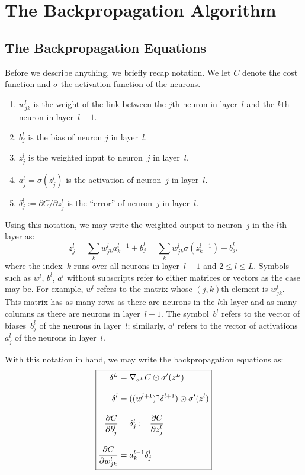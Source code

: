\chapter{The Backpropagation Algorithm}

\section{The Backpropagation Equations}

Before we describe anything, we briefly recap notation. We let 
$C$ denote the cost function and $\sigma$ the activation function 
of the neurons. 
\begin{enumerate}
    \item $w_{j k}^{l}$ is the weight of the link between the $j$th
        neuron in layer~$l$ and the $k$th neuron in layer~$l - 1$.
    \item $b_j^l$ is the bias of neuron $j$ in layer~$l$.
    \item $z_{j}^l$ is the weighted input to neuron~$j$ in layer~$l$.
    \item $a_j^{l} = \sigma(z_{j}^l)$ is the activation of neuron~$j$ in 
        layer~$l$.
    \item $\delta_{j}^{l} := \partial C / \partial z_{j}^{l}$ is 
        the ``error'' of neuron~$j$ in layer~$l$.
\end{enumerate}

Using this notation, we may write the weighted output to neuron~$j$
in the $l$th layer as:
\[
    z_{j}^{l} = \sum_{k} w_{j k}^l a_{k}^{l - 1} + b_{j}^l = 
                \sum_{k} w_{j k}^l \sigma (z_{k}^{l - 1}) + b_{j}^l, 
\]
where the index~$k$ runs over all neurons in layer~$l - 1$ and 
$2 \leq l \leq L$. Symbols such as $w^{l}$, $b^{l}$, $a^{l}$ without 
subscripts refer to either matrices or vectors as the case may be. 
For example, $w^{l}$ refers to the matrix whose $(j, k)$th element 
is $w_{j k}^{l}$. This matrix has as many rows as there are neurons
in the $l$th layer and as many columns as there are neurons in 
layer~$l - 1$. The symbol~$b^{l}$ refers to the vector of 
biases~$b_{j}^l$ of the neurons in layer~$l$; similarly, $a^{l}$ 
refers to the vector of activations~$a_{j}^l$ of the neurons in 
layer~$l$.

With this notation in hand, we may write the backpropagation equations
as:
\begin{equation}
\boxed{
\setlength{\jot}{12pt}
\begin{aligned}
    \delta^{L} & = \nabla_{a^L} C \odot \sigma'(z^L) \\
    \delta^{l} & = ( \trans{(w^{l + 1})} \delta^{l + 1} ) \odot \sigma'(z^l) \\
    \frac{\partial C}{\partial b_j^{l}} & = \delta_{j}^l := \frac{\partial C}{\partial z_j^l}\\
    \frac{\partial C}{\partial w_{j k}^l} & = a_{k}^{l - 1} \delta_{j}^l
\end{aligned}
}
\end{equation}

